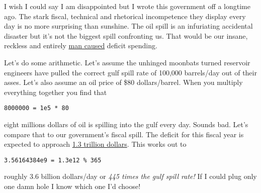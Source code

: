 I wish I could say I am disappointed but I wrote this government off a
longtime ago. The stark fiscal, technical and rhetorical incompetence
they display every day is no more surprising than sunshine. The oil
spill is an infuriating accidental disaster but it's not the biggest
spill confronting us. That would be our insane, reckless and entirely
\href{http://newsbusters.org/blogs/tim-graham/2009/03/19/obama-speak-homeland-security-secretary-replaces-terrorism-term-man-caus}{man
caused} deficit spending.

Let's do some arithmetic. Let's assume the unhinged moonbats turned
reservoir engineers have pulled the correct gulf spill rate of 100,000
barrels/day out of their asses. Let's also assume an oil price of \$80
dollars/barrel. When you multiply everything together you find that
\begin{verbatim}
8000000 = 1e5 * 80
\end{verbatim}
eight millions dollars of oil is spilling into the gulf every day.
Sounds bad. Let's compare that to our government's fiscal spill. The
deficit for this fiscal year is expected to approach
\href{http://www.usdebtclock.org/}{1.3 trillion dollars}. This works out
to
\begin{verbatim}
3.56164384e9 = 1.3e12 % 365
\end{verbatim}
roughly 3.6 billion dollars/day or \emph{445 times the gulf spill rate!}
If I could plug only one damn hole I know which one I'd choose!




%